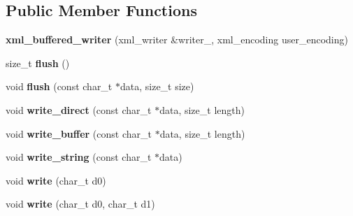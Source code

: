 \subsection*{Public Member Functions}
\begin{DoxyCompactItemize}
\item 
\hypertarget{classxml__buffered__writer_a3c22ad246e2aebb6597935baf4a223a7}{}{\bfseries xml\+\_\+buffered\+\_\+writer} (xml\+\_\+writer \&writer\+\_\+, xml\+\_\+encoding user\+\_\+encoding)\label{classxml__buffered__writer_a3c22ad246e2aebb6597935baf4a223a7}

\item 
\hypertarget{classxml__buffered__writer_a4789b8661f9ff4e5e4bb4226f7d45997}{}size\+\_\+t {\bfseries flush} ()\label{classxml__buffered__writer_a4789b8661f9ff4e5e4bb4226f7d45997}

\item 
\hypertarget{classxml__buffered__writer_aa733cb2cd0d5fcacec92c67a7f26c553}{}void {\bfseries flush} (const char\+\_\+t $\ast$data, size\+\_\+t size)\label{classxml__buffered__writer_aa733cb2cd0d5fcacec92c67a7f26c553}

\item 
\hypertarget{classxml__buffered__writer_a119f9db2f60e578e69ac81177e932fb3}{}void {\bfseries write\+\_\+direct} (const char\+\_\+t $\ast$data, size\+\_\+t length)\label{classxml__buffered__writer_a119f9db2f60e578e69ac81177e932fb3}

\item 
\hypertarget{classxml__buffered__writer_ae62b84beff660555acb76e277f967c0d}{}void {\bfseries write\+\_\+buffer} (const char\+\_\+t $\ast$data, size\+\_\+t length)\label{classxml__buffered__writer_ae62b84beff660555acb76e277f967c0d}

\item 
\hypertarget{classxml__buffered__writer_a1699556c38e942f7c1db1b98ddf15642}{}void {\bfseries write\+\_\+string} (const char\+\_\+t $\ast$data)\label{classxml__buffered__writer_a1699556c38e942f7c1db1b98ddf15642}

\item 
\hypertarget{classxml__buffered__writer_a1aa829bd551a69dd9005d2d46063308f}{}void {\bfseries write} (char\+\_\+t d0)\label{classxml__buffered__writer_a1aa829bd551a69dd9005d2d46063308f}

\item 
\hypertarget{classxml__buffered__writer_a4cd6e908908e17c9b07eba34f7317791}{}void {\bfseries write} (char\+\_\+t d0, char\+\_\+t d1)\label{classxml__buffered__writer_a4cd6e908908e17c9b07eba34f7317791}


\end{DoxyCompactItemize}
